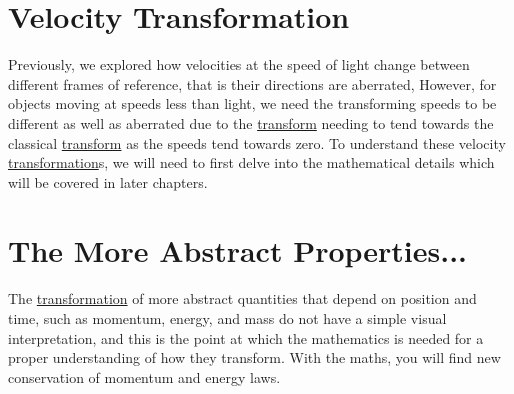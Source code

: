 \section{Velocity Transformation}

Previously, we explored how velocities at the speed of light change between different frames of reference, that is their directions are aberrated, However, for objects moving at speeds less than light, we need the transforming speeds to be different as well as aberrated due to the \hyperlink{def-transform}{transform} needing to tend towards the classical \hyperlink{def-transform}{transform} as the speeds tend towards zero. To understand these velocity \hyperlink{def-transform}{transformation}s, we will need to first delve into the mathematical details which will be covered in later chapters.




\section{The More Abstract Properties...}%

The \hyperlink{def-transform}{transformation} of more abstract quantities that depend on position and time, such as momentum, energy, and mass do not have a simple visual interpretation, and this is the point at which the mathematics is needed for a proper understanding of how they transform. With the maths, you will find new conservation of momentum and energy laws.



